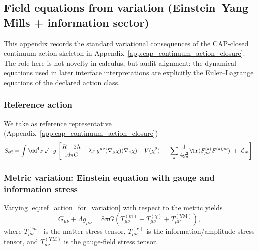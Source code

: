 \subsection{Field equations from variation (Einstein--Yang--Mills + information sector)}
\label{app:variational_field_equations}

This appendix records the standard variational consequences of the CAP-closed continuum action skeleton in Appendix~\ref{app:cap_continuum_action_closure}.
The role here is not novelty in calculus, but audit alignment: the dynamical equations used in later interface interpretations are explicitly the Euler--Lagrange equations of the declared action class.

\subsubsection{Reference action}
\label{subsec:ref_action_for_variation}

We take as reference representative (Appendix~\ref{app:cap_continuum_action_closure})
\begin{equation}
\label{eq:ref_action_for_variation}
S_{\mathrm{eff}}
=\int \dd^{4}x\,\sqrt{-g}\,
\left[
\frac{R-2\Lambda}{16\pi G}
-\lambda_F\, g^{\mu\nu}(\nabla_\mu\chi)(\nabla_\nu\chi)
-V(\chi^{2})
\;-\;\sum_{a}\frac{1}{4g_a^2}\Tr(F^{(a)}_{\mu\nu}F^{(a)\mu\nu})
\;+\;\mathcal{L}_{m}
\right].
\end{equation}

\subsubsection{Metric variation: Einstein equation with gauge and information stress}
\label{subsec:einstein_equation_variation}

\begin{theorem}
\label{thm:einstein_equation_total_stress}
Varying \eqref{eq:ref_action_for_variation} with respect to the metric yields
\begin{equation}
\label{eq:einstein_total_stress}
G_{\mu\nu}+\Lambda g_{\mu\nu}
=8\pi G\left(T^{(m)}_{\mu\nu}+T^{(\chi)}_{\mu\nu}+T^{(\mathrm{YM})}_{\mu\nu}\right),
\end{equation}
where $T^{(m)}_{\mu\nu}$ is the matter stress tensor, $T^{(\chi)}_{\mu\nu}$ is the information/amplitude stress tensor,
and $T^{(\mathrm{YM})}_{\mu\nu}$ is the gauge-field stress tensor.
\end{theorem}

